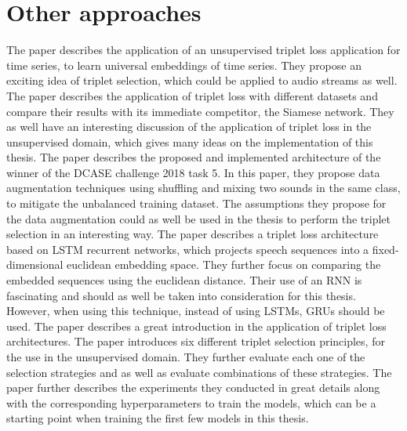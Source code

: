 \section{Other approaches}
\label{sec:Other-Approaches}
The paper \cite{franceschi_unsupervised_2020} describes the application of an unsupervised triplet loss application for time series, to learn universal embeddings of time series. They propose an exciting idea of triplet selection, which could be applied to audio streams as well.
\newline
\newline
The paper \cite{hoffer_deep_2018} describes the application of triplet loss with different datasets and compare their results with its immediate competitor, the Siamese network. They as well have an interesting discussion of the application of triplet loss in the unsupervised domain, which gives many ideas on the implementation of this thesis.
\newline
\newline
The paper \cite{inoue_domestic_2018} describes the proposed and implemented architecture of the winner of the \gls{DCASE} challenge 2018 task 5. In this paper, they propose data augmentation techniques using shuffling and mixing two sounds in the same class, to mitigate the unbalanced training dataset. The assumptions they propose for the data augmentation could as well be used in the thesis to perform the triplet selection in an interesting way.
\newline
\newline
The paper \cite{bredin_tristounet_2017} describes a triplet loss architecture based on \gls{LSTM} recurrent networks, which projects speech sequences into a fixed-dimensional euclidean embedding space. They further focus on comparing the embedded sequences using the euclidean distance. Their use of an \gls{RNN} is fascinating and should as well be taken into consideration for this thesis. However, when using this technique, instead of using \glspl{LSTM}, \glspl{GRU} should be used.
\newline
\newline
The paper \cite{jansen_unsupervised_2018} describes a great introduction in the application of triplet loss architectures. The paper introduces six different triplet selection principles, for the use in the unsupervised domain. They further evaluate each one of the selection strategies and as well as evaluate combinations of these strategies. The paper further describes the experiments they conducted in great details along with the corresponding hyperparameters to train the models, which can be a starting point when training the first few models in this thesis. 